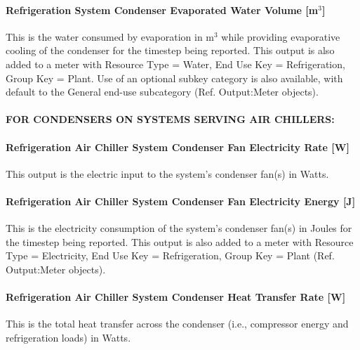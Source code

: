 \paragraph{Refrigeration System Condenser Evaporated Water Volume {[}m\(^{3}\){]}}\label{refrigeration-system-condenser-evaporated-water-volume-m3}

This is the water consumed by evaporation in m\(^{3}\) while providing evaporative cooling of the condenser for the timestep being reported. This output is also added to a meter with Resource Type = Water, End Use Key = Refrigeration, Group Key = Plant. Use of an optional subkey category is also available, with default to the General end-use subcategory (Ref. Output:Meter objects).

\paragraph{FOR CONDENSERS ON SYSTEMS SERVING AIR CHILLERS:}\label{for-condensers-on-systems-serving-air-chillers-1}

\paragraph{Refrigeration Air Chiller System Condenser Fan Electricity Rate {[}W{]}}\label{refrigeration-air-chiller-system-condenser-fan-electric-power-w-1}

This output is the electric input to the system's condenser fan(s) in Watts.

\paragraph{Refrigeration Air Chiller System Condenser Fan Electricity Energy {[}J{]}}\label{refrigeration-air-chiller-system-condenser-fan-electric-energy-j-1}

This is the electricity consumption of the system's condenser fan(s) in Joules for the timestep being reported. This output is also added to a meter with Resource Type = Electricity, End Use Key = Refrigeration, Group Key = Plant (Ref. Output:Meter objects).

\paragraph{Refrigeration Air Chiller System Condenser Heat Transfer Rate {[}W{]}}\label{refrigeration-air-chiller-system-condenser-heat-transfer-rate-w-1}

This is the total heat transfer across the condenser (i.e., compressor energy and refrigeration loads) in Watts.


